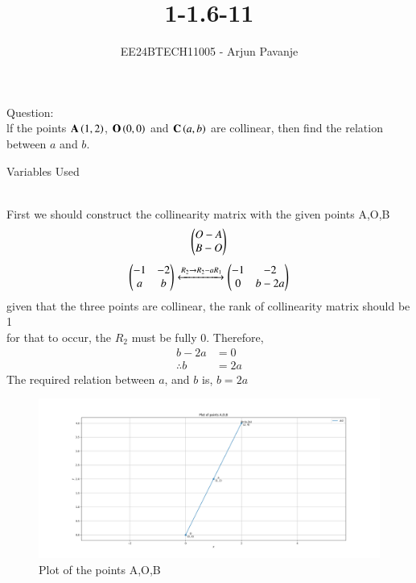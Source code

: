 \documentclass[journal]{IEEEtran}
\begin{document}

\vspace{3cm}

\title{1-1.6-11}
\author{EE24BTECH11005 - Arjun Pavanje
}
{\let\newpage\relax\maketitle}
Question:\\
lf the points $\mathbf{A}\left(1, 2\right)$, $\mathbf{O}\left(0, 0\right)$ and $\mathbf{C}\left(a,b\right)$ are collinear, then find the relation between
$a$ and $b$.
\\
\solution
\begin{table}[h!]    
  \centering
  
  \caption{Variables Used}
  \label{tab1-1.5-29}
\end{table}\\
First we should construct the collinearity matrix with the given points A,O,B
\begin{align}
\begin{pmatrix}
O-A \\
B-O
\end{pmatrix}
\end{align}
\begin{align}
\begin{pmatrix}
-1 & -2\\
a & b
\end{pmatrix}
\xleftrightarrow[]{R_2 \rightarrow {R_2-aR_1}}
\begin{pmatrix}
-1 & -2\\
0 & b-2a
\end{pmatrix}
\end{align}
given that the three points are collinear, the rank of collinearity matrix should be 1\\
for that to occur, the $R_2$ must be fully $0$.
Therefore,
\begin{align}
	b-2a&=0\\
	\therefore b&=2a
\end{align}
The required relation between $a$, and $b$ is, $b=2a$
\begin{figure}[h!]
   \centering
   \includegraphics[width=0.7\linewidth]{figs/Figure_1.png}
   \caption{Plot of the points A,O,B}
   \label{stemplot}
\end{figure}
\end{document}
